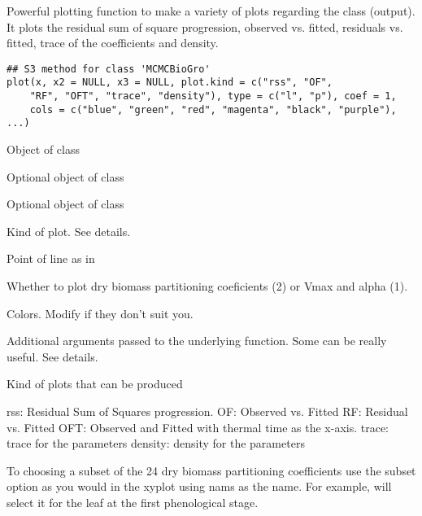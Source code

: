 \documentclass[letterpaper]{book}
\begin{document}
%
\begin{SeeAlso}\relax
{} 
\end{SeeAlso}
%
\begin{Description}\relax
Powerful plotting function to make a variety of plots regarding the
 class (output). It plots the residual sum of square
progression, observed vs. fitted, residuals vs. fitted, trace of the
coefficients and density.
\end{Description}
%
\begin{Usage}
\begin{verbatim}
## S3 method for class 'MCMCBioGro'
plot(x, x2 = NULL, x3 = NULL, plot.kind = c("rss", "OF", 
    "RF", "OFT", "trace", "density"), type = c("l", "p"), coef = 1, 
    cols = c("blue", "green", "red", "magenta", "black", "purple"), ...) 
\end{verbatim}
\end{Usage}
%
\begin{Arguments}
\begin{ldescription}
\item[\code{x}]  Object of class  
\item[\code{x2}]  Optional object of class  
\item[\code{x3}]  Optional object of class 
\item[\code{plot.kind}]  Kind of plot. See details. 
\item[\code{type}]  Point of line as in  
\item[\code{coef}]  Whether to plot dry biomass partitioning coeficients (2)
or Vmax and alpha (1).  
\item[\code{cols}]  Colors. Modify if they don't suit you.
\item[\code{...}]  Additional arguments passed to the underlying
 function. Some can be really useful. See details. 
\end{ldescription}
\end{Arguments}
%
\begin{Details}\relax
Kind of plots that can be produced

rss: Residual Sum of Squares progression.
OF: Observed vs. Fitted
RF: Residual vs. Fitted
OFT: Observed and Fitted with thermal time as the x-axis.
trace: trace for the parameters
density: density for the parameters








To choosing a subset of the 24 dry biomass partitioning coefficients
use the subset option as you would in the xyplot using nams as the
name. For example,
 will select it
for the leaf at the first phenological stage.
\end{Details}
\end{document}
